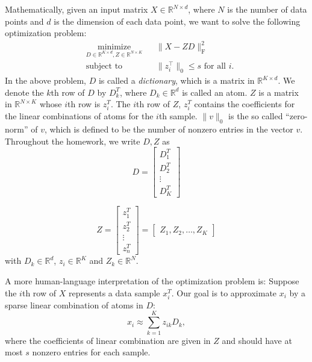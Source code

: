 Mathematically, given an input matrix $X\in\mathbb R^{N\times d}$,
where $N$ is the number of data points and $d$ is the dimension of
each data point, we want to solve the following optimization problem:
\begin{equation}
\label{eq:obj}
\begin{aligned}
& \underset{D\in\mathbb R^{K\times d}, Z\in\mathbb R^{N\times K}}{\text{minimize}}
& & \|X-ZD\|_{\text{F}}^2\\
& \text{subject to}
& & \|z_i^\top \|_0\leq s \text{ for all $i$}.
\end{aligned}
\end{equation}
In the above problem, $D$ is called a \textit{dictionary}, which is a
matrix in $\mathbb R^{K\times d}$. We denote the $k$th row of $D$ by
$D_k^T$, where $D_k\in\mathbb R^d$ is called an atom. $Z$ is a matrix
in $\mathbb R^{N\times K}$ whose $i$th row is $z_i^T$. The $i$th row
of $Z$, $z_i^T$ contains the coefficients for the linear combinations
of atoms for the $i$th sample. $\|v\|_0$ is the so called ``zero-norm'' of $v$, which is defined to be the number of nonzero entries in the vector $v$. Throughout the homework, we write $D,Z$ as 
\begin{equation*}
D = \begin{bmatrix}
D_1^T\\
D_2^T\\
\vdots\\
D_K^T
\end{bmatrix}
\end{equation*}

\begin{equation*}
Z = \begin{bmatrix}
z_1^T\\
z_2^T\\
\vdots\\
z_n^T
\end{bmatrix}
=\begin{bmatrix}
Z_1,Z_2,\dots,Z_K
\end{bmatrix}
\end{equation*}
with $D_k\in\mathbb R^d$, $z_i\in\mathbb R^K$ and $Z_k\in\mathbb R^N$.


A more human-language interpretation of the optimization problem is:
Suppose the $i$th row of $X$ represents a data sample $x_i^T$. Our
goal is to approximate $x_i$ by a sparse linear combination of atoms in $D$:
\begin{equation*}
x_i \approx \sum_{k=1}^Kz_{ik}D_k,
\end{equation*}
where the coefficients of linear combination are given in $Z$ and
should have at most $s$ nonzero entries for each sample.  

